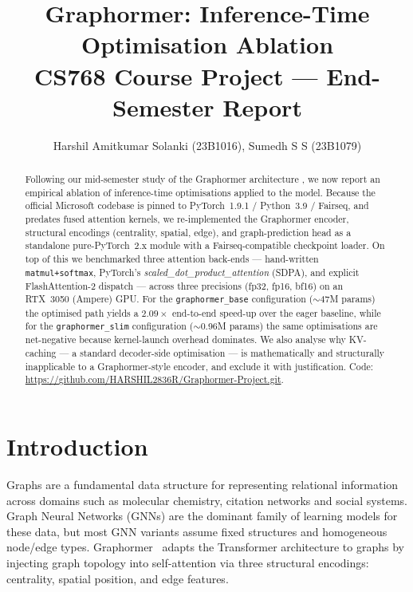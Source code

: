 \documentclass[11pt]{article}
\title{\textbf{Graphormer: Inference-Time Optimisation Ablation \\
\large CS768 Course Project --- End-Semester Report}}
\author{
Harshil Amitkumar Solanki (23B1016), Sumedh S S (23B1079) \\
}
\date{}
\begin{document}
\maketitle

\begin{abstract}
Following our mid-semester study of the Graphormer architecture
\cite{graphormer}, we now report an empirical ablation of inference-time
optimisations applied to the model. Because the official Microsoft codebase
is pinned to PyTorch~1.9.1 / Python~3.9 / Fairseq, and predates fused
attention kernels, we re-implemented the Graphormer encoder, structural
encodings (centrality, spatial, edge), and graph-prediction head as a
standalone pure-PyTorch~2.x module with a Fairseq-compatible checkpoint
loader. On top of this we benchmarked three attention back-ends ---
hand-written \texttt{matmul+softmax}, PyTorch's \emph{scaled\_dot\_product\_attention}
(SDPA), and explicit FlashAttention-2 dispatch --- across three precisions
(fp32, fp16, bf16) on an RTX~3050 (Ampere) GPU. For the
\texttt{graphormer\_base} configuration ($\sim$47M params) the optimised path
yields a $\mathbf{2.09\times}$ end-to-end speed-up over the eager baseline,
while for the \texttt{graphormer\_slim} configuration ($\sim$0.96M params) the
same optimisations are net-negative because kernel-launch overhead dominates.
We also analyse why KV-caching --- a standard decoder-side optimisation ---
is mathematically and structurally inapplicable to a Graphormer-style
encoder, and exclude it with justification. Code:
\url{https://github.com/HARSHIL2836R/Graphormer-Project.git}.
\end{abstract}

\section{Introduction}

Graphs are a fundamental data structure for representing relational
information across domains such as molecular chemistry, citation networks
and social systems. Graph Neural Networks (GNNs) are the dominant family
of learning models for these data, but most GNN variants assume fixed
structures and homogeneous node/edge types. Graphormer~\cite{graphormer}
adapts the Transformer architecture to graphs by injecting graph topology
into self-attention via three structural encodings: centrality, spatial
position, and edge features.
\end{document}
